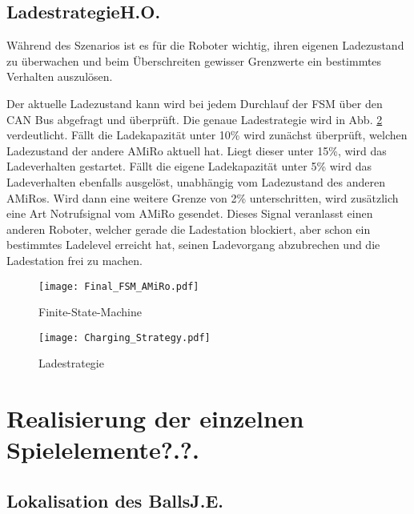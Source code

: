 \subsection[Ladestrategie]{Ladestrategie\hfill {\normalsize H.O.}}
Während des Szenarios ist es für die Roboter wichtig, ihren eigenen Ladezustand zu überwachen und beim Überschreiten gewisser Grenzwerte ein bestimmtes Verhalten auszulösen.

Der aktuelle Ladezustand kann wird bei jedem Durchlauf der FSM über den CAN Bus abgefragt und überprüft. Die genaue Ladestrategie wird in Abb. \ref{fig:charging-strategy} verdeutlicht. Fällt die Ladekapazität unter 10\%  wird zunächst überprüft, welchen Ladezustand der andere AMiRo aktuell hat. Liegt dieser unter 15\%, wird das Ladeverhalten gestartet. Fällt die eigene Ladekapazität unter 5\% wird das Ladeverhalten ebenfalls ausgelöst, unabhängig vom Ladezustand des anderen AMiRos. Wird dann eine weitere Grenze von 2\% unterschritten, wird zusätzlich eine Art Notrufsignal vom AMiRo gesendet. Dieses Signal veranlasst einen anderen Roboter, welcher gerade die Ladestation blockiert, aber schon ein bestimmtes Ladelevel erreicht hat, seinen Ladevorgang abzubrechen und die Ladestation frei zu machen.

\begin{figure}
	\begin{center}
		\texttt{[image: Final\_FSM\_AMiRo.pdf]} 	
		\caption{Finite-State-Machine}
		\label{fig:fsm-amiro}
	\end{center}
\end{figure}
\begin{figure}
	\begin{center}
		\texttt{[image: Charging\_Strategy.pdf]} 	
		\caption{Ladestrategie}
		\label{fig:charging-strategy}
	\end{center}
\end{figure}


\section[Realisierung der einzelnen Spielelemente]{Realisierung der einzelnen Spielelemente\hfill {\normalsize ?.?.}}%

\subsection[Lokalisation des Balls]{Lokalisation des Balls\hfill {\normalsize J.E.}} %
\label{subsection:locateBall}


